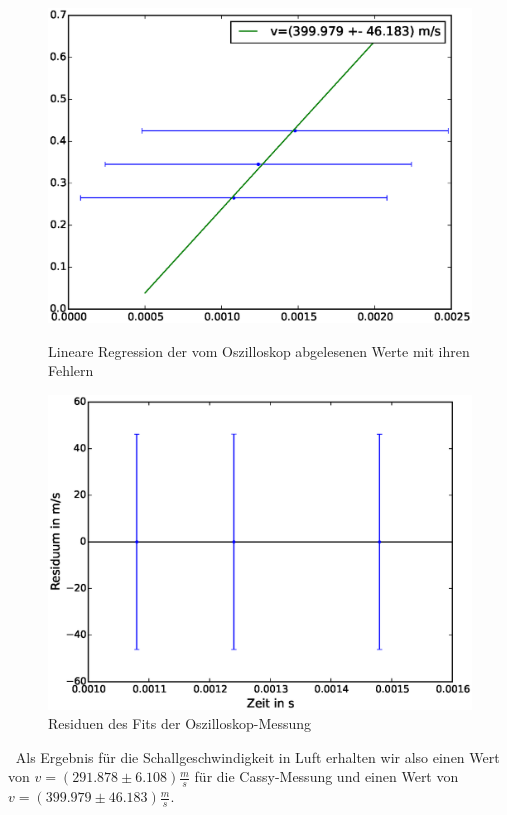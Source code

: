\documentclass[12pt,a4paper]{article}
\begin{document}
\begin{figure}[H]
\centering
\includegraphics[scale=0.8]{Bilder/Linreg-Oszi.eps}
\caption{Lineare Regression der vom Oszilloskop abgelesenen Werte mit ihren Fehlern}
\includegraphics[scale=0.8]{Bilder/Residuen-Oszi.eps}
\caption{Residuen des Fits der Oszilloskop-Messung}
\end{figure}
$~$\newline
Als Ergebnis für die Schallgeschwindigkeit in Luft erhalten wir also einen Wert von \newline $v=(291.878 \pm 6.108) \frac{m}{s}$ für die Cassy-Messung und einen Wert von\newline $v=(399.979 \pm 46.183)\frac{m}{s}$.
\end{document}
